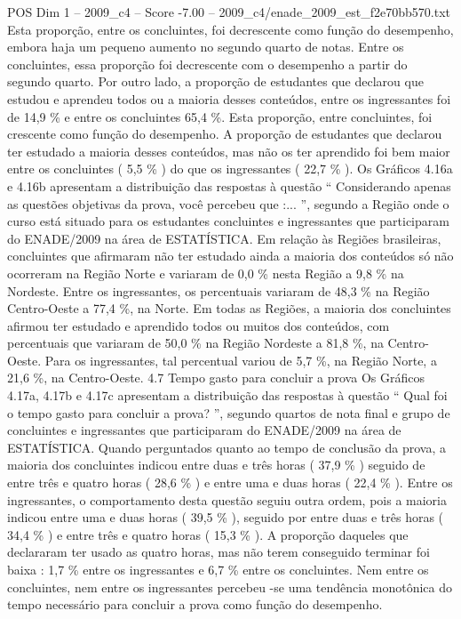 \begin{textsample}{POS Dim 1 – 2009\_c4 – Score -7.00 – 2009\_c4/enade\_2009\_est\_f2e70bb570.txt}
Esta proporção, entre os concluintes, foi decrescente como função do desempenho, embora haja um pequeno aumento no segundo quarto de notas.
Entre os concluintes, essa proporção foi decrescente com o desempenho a partir do segundo quarto.
Por outro lado, a proporção de estudantes que declarou que estudou e aprendeu todos ou a maioria desses conteúdos, entre os ingressantes foi de 14,9 \% e entre os concluintes 65,4 \%.
Esta proporção, entre concluintes, foi crescente como função do desempenho.
A proporção de estudantes que declarou ter estudado a maioria desses conteúdos, mas não os ter aprendido foi bem maior entre os concluintes ( 5,5 \% ) do que os ingressantes ( 22,7 \% ).
Os Gráficos 4.16a e 4.16b apresentam a distribuição das respostas à questão “ Considerando apenas as questões objetivas da prova, você percebeu que :... ”, segundo a Região onde o curso está situado para os estudantes concluintes e ingressantes que participaram do ENADE/2009 na área de ESTATÍSTICA.
Em relação às Regiões brasileiras, concluintes que afirmaram não ter estudado ainda a maioria dos conteúdos só não ocorreram na Região Norte e variaram de 0,0 \% nesta Região a 9,8 \% na Nordeste.
Entre os ingressantes, os percentuais variaram de 48,3 \% na Região Centro-Oeste a 77,4 \%, na Norte.
Em todas as Regiões, a maioria dos concluintes afirmou ter estudado e aprendido todos ou muitos dos conteúdos, com percentuais que variaram de 50,0 \% na Região Nordeste a 81,8 \%, na Centro-Oeste.
Para os ingressantes, tal percentual variou de 5,7 \%, na Região Norte, a 21,6 \%, na Centro-Oeste. 4.7 Tempo gasto para concluir a prova Os Gráficos 4.17a, 4.17b e 4.17c apresentam a distribuição das respostas à questão “ Qual foi o tempo gasto para concluir a prova? ”, segundo quartos de nota final e grupo de concluintes e ingressantes que participaram do ENADE/2009 na área de ESTATÍSTICA.
Quando perguntados quanto ao tempo de conclusão da prova, a maioria dos concluintes indicou entre duas e três horas ( 37,9 \% ) seguido de entre três e quatro horas ( 28,6 \% ) e entre uma e duas horas ( 22,4 \% ).
Entre os ingressantes, o comportamento desta questão seguiu outra ordem, pois a maioria indicou entre uma e duas horas ( 39,5 \% ), seguido por entre duas e três horas ( 34,4 \% ) e entre três e quatro horas ( 15,3 \% ).
A proporção daqueles que declararam ter usado as quatro horas, mas não terem conseguido terminar foi baixa : 1,7 \% entre os ingressantes e 6,7 \% entre os concluintes.
Nem entre os concluintes, nem entre os ingressantes percebeu -se uma tendência monotônica do tempo necessário para concluir a prova como função do desempenho.

\end{textsample}
